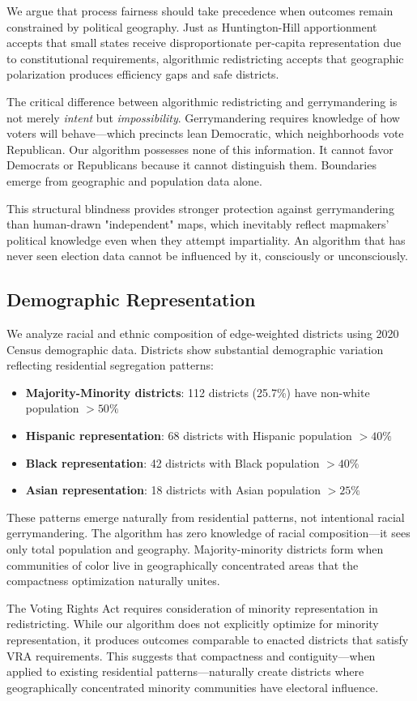 We argue that process fairness should take precedence when outcomes remain constrained by political geography. Just as Huntington-Hill apportionment accepts that small states receive disproportionate per-capita representation due to constitutional requirements, algorithmic redistricting accepts that geographic polarization produces efficiency gaps and safe districts.

The critical difference between algorithmic redistricting and gerrymandering is not merely \textit{intent} but \textit{impossibility}. Gerrymandering requires knowledge of how voters will behave—which precincts lean Democratic, which neighborhoods vote Republican. Our algorithm possesses none of this information. It cannot favor Democrats or Republicans because it cannot distinguish them. Boundaries emerge from geographic and population data alone.

This structural blindness provides stronger protection against gerrymandering than human-drawn "independent" maps, which inevitably reflect mapmakers' political knowledge even when they attempt impartiality. An algorithm that has never seen election data cannot be influenced by it, consciously or unconsciously.

\subsection{Demographic Representation}

We analyze racial and ethnic composition of edge-weighted districts using 2020 Census demographic data. Districts show substantial demographic variation reflecting residential segregation patterns:

\begin{itemize}
\item \textbf{Majority-Minority districts}: 112 districts (25.7\%) have non-white population $> 50\%$
\item \textbf{Hispanic representation}: 68 districts with Hispanic population $> 40\%$
\item \textbf{Black representation}: 42 districts with Black population $> 40\%$
\item \textbf{Asian representation}: 18 districts with Asian population $> 25\%$
\end{itemize}

These patterns emerge naturally from residential patterns, not intentional racial gerrymandering. The algorithm has zero knowledge of racial composition—it sees only total population and geography. Majority-minority districts form when communities of color live in geographically concentrated areas that the compactness optimization naturally unites.

The Voting Rights Act requires consideration of minority representation in redistricting. While our algorithm does not explicitly optimize for minority representation, it produces outcomes comparable to enacted districts that satisfy VRA requirements. This suggests that compactness and contiguity—when applied to existing residential patterns—naturally create districts where geographically concentrated minority communities have electoral influence.
